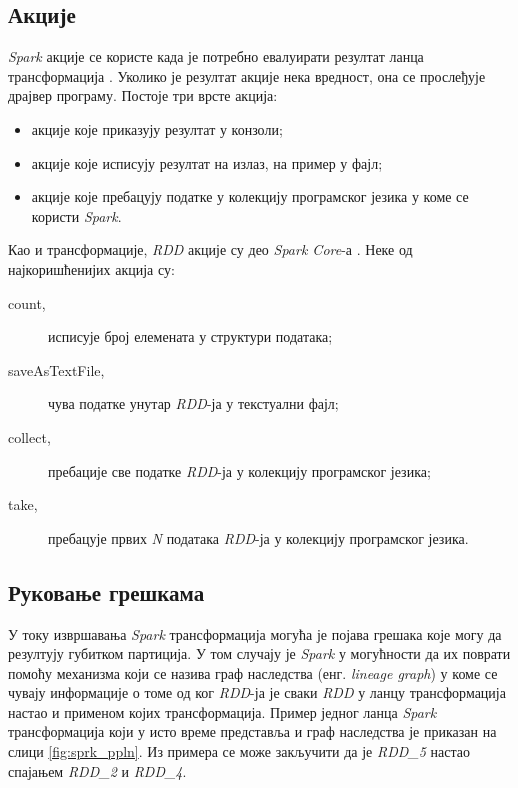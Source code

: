 \documentclass[12pt,oneside]{memoir}
\begin{document}
\subsection{Акције}
\label{subsec:spark_akc}

\textit{Spark} акције се користе када је потребно евалуирати резултат ланца трансформација \cite{spark_guide}. Уколико је резултат акције нека вредност, она се прослеђује драјвер програму. Постоје три врсте акција:

\begin{itemize}
\item акције које приказују резултат у конзоли;
\item акције које исписују резултат на излаз, на пример у фајл;
\item акције које пребацују податке у колекцију програмског језика у коме се користи \textit{Spark}.
\end{itemize}

Као и трансформације, \textit{RDD} акције су део \textit{Spark Core}-а  \cite{spark_rdd_transf}. Неке од најкоришћенијих акција су:

\begin{description}
	\item[count,] исписује број елемената у структури података;
	\item[saveAsTextFile,] чува податке унутар \textit{RDD}-ја у текстуални фајл;
	\item[collect,] пребације све податке \textit{RDD}-ја у колекцију програмског језика;
	\item[take,] пребацује првих \textit{N} података \textit{RDD}-ја у колекцију програмског језика.
\end{description}

\subsection{Руковање грешкама}
\label{subsec:spark_dags}

У току извршавања \textit{Spark} трансформација могућа је појава грешака које могу да резултују губитком партиција. У том случају је \textit{Spark} у могућности да их поврати помоћу механизма који се назива граф наследства (енг. \textit{lineage graph}) у коме се чувају информације о томе од ког \textit{RDD}-ја је сваки \textit{RDD} у ланцу трансформација настао и применом којих трансформација. Пример једног ланца \textit{Spark} трансформација који у исто време представља и граф наследства је приказан на  слици \ref{fig:sprk_ppln}. Из примера се може закључити да је \textit{RDD\_5} настао спајањем \textit{RDD\_2} и \textit{RDD\_4}.
\end{document}
